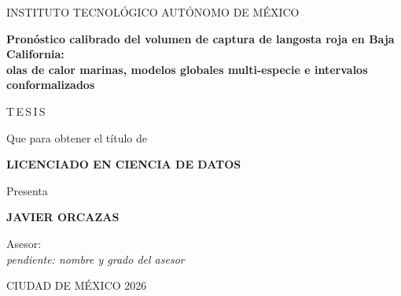 %
%
\thispagestyle{empty}
\begin{center}

\vspace*{1.5cm}
{\large INSTITUTO TECNOLÓGICO AUTÓNOMO DE MÉXICO}

\vspace{2.5cm}
{\LARGE\bfseries Pronóstico calibrado del volumen de captura de langosta roja en Baja California:\\[0.3cm]
olas de calor marinas, modelos globales multi-especie e intervalos conformalizados}

\vspace{2.5cm}
{\large T\,E\,S\,I\,S}

\vspace{0.6cm}
{\large Que para obtener el título de}

\vspace{0.4cm}
{\large\bfseries LICENCIADO EN CIENCIA DE DATOS}

\vspace{0.6cm}
{\large Presenta}

\vspace{0.4cm}
{\large\bfseries JAVIER ORCAZAS}

\vspace{2.0cm}
\providecommand{\asesor}{\underline{\hspace{6cm}}\\[0.2cm]{\small\itshape pendiente: nombre y grado del asesor}}
{\large Asesor: \asesor}

\vfill
{\large CIUDAD DE MÉXICO \hfill 2026}

\end{center}
\cleardoublepage
